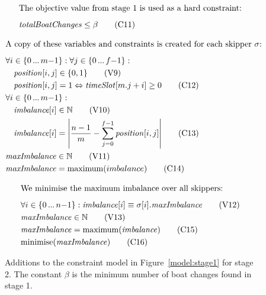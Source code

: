 \documentclass{llncs}
\newcommand{\timeSlot}{\mathit{timeSlot}}
\newcommand{\totalBoatChanges}{\mathit{totalBoatChanges}}
\newcommand{\position}{\mathit{position}}
\newcommand{\imbalance}{\mathit{imbalance}}
\newcommand{\maxImbalance}{\mathit{maxImbalance}}
\newcommand{\minimise}{\mathrm{minimise}}
\newcommand{\maximum}{\mathrm{maximum}}
\DeclarePairedDelimiter\abs{\lvert}{\rvert}
\newcommand\nldots{\,\hbox to 0.8em{.\hss.\hss.}\,}
\begin{document}
{\begin{figure}[p]
\setlength{\mathindent}{1em}
\setlength{\abovedisplayskip}{0pt}
\setlength{\belowdisplayskip}{0pt}
\setlength{\abovecaptionskip}{0pt}
\begin{framed}
\begin{align}
    \intertext{The objective value from stage 1 is used as a hard constraint:\smallskip}
    & \totalBoatChanges \leq \beta \tag{C11} \label{C11}
\end{align}
\end{framed}\begin{framed}
\begin{align}
    \intertext{A copy of these variables and constraints is created for each skipper $\sigma$:\smallskip}
    & \forall i \in \{ 0 \nldots m{-}1 \} : \forall j \in \{ 0 \nldots f{-}1 \} : \nonumber \\
    & \hspace*{1em} \position[{i,j}] \in \{0,1\} \tag{V9} \label{V9} \\
    & \hspace*{1em} \position[{i,j}] = 1 \Leftrightarrow \timeSlot[{m.j+i}] \geq 0 \tag{C12} \label{C12} \\
    & \forall i \in \{ 0 \nldots m{-}1 \} : \nonumber \\
    & \hspace*{1em} \imbalance[{i}] \in \mathbb{N} \label{V10} \tag{V10} \\
    & \hspace*{1em} \imbalance[{i}] = \abs*{\frac{n-1}{m} - \sum_{j=0}^{f-1} \position[{i,j}]} \label{C13} \tag{C13} \\
    & \maxImbalance \in \mathbb{N} \label{V11} \tag{V11} \\
    & \maxImbalance = \maximum(imbalance) \label{C14} \tag{C14}
\end{align}
\end{framed}\begin{framed}
\begin{align}
    \intertext{We minimise the maximum imbalance over all skippers:\smallskip}
    & \forall i \in \{ 0 \nldots n{-}1 \} : \imbalance[{i}] \equiv \sigma[{i}].\maxImbalance \label{V12} \tag{V12} \\
    & \maxImbalance \in \mathbb{N} \label{V13} \tag{V13} \\
    & \maxImbalance = \maximum(\imbalance) \label{C15} \tag{C15} \\
    & \minimise(\maxImbalance) \label{C16} \tag{C16}
\end{align}
\end{framed}
\caption{Additions to the constraint model in Figure~\ref{model:stage1} for stage 2. The constant
$\beta$ is the minimum number of boat changes found in stage 1.}\label{model:stage2}
\end{figure}

}
\end{document}
